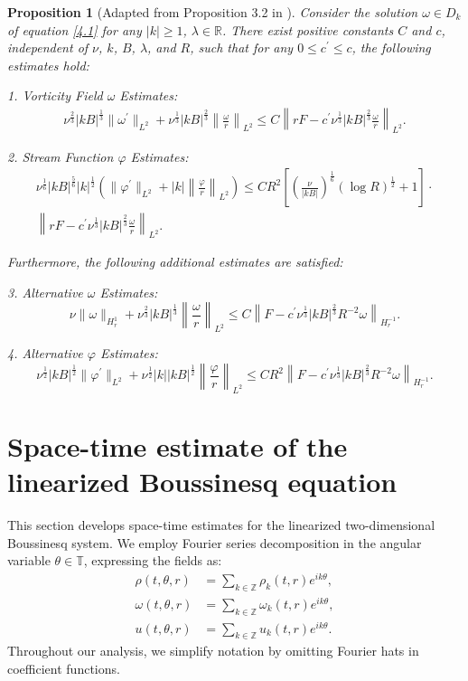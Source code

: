 \documentclass[final, 12pt,reqno]{amsart}
\newtheorem{proposition}[theorem]{\bf Proposition}
\numberwithin{equation}{section}
\begin{document}
\begin{proposition}[Adapted from Proposition 3.2 in \cite{An.2024}]\label{pro4.1}
Consider the solution $\omega \in D_k$ of equation \eqref{4.1} for any $|k| \geq 1$, $\lambda \in \mathbb{R}$. There exist positive constants $C$ and $c$, independent of $\nu$, $k$, $B$, $\lambda$, and $R$, such that for any $0 \leq c^{\prime} \leq c$, the following estimates hold:

1.  Vorticity Field $\omega$ Estimates:
    $$
    \begin{aligned}
    \nu^{\frac{2}{3}} |k B|^{\frac{1}{3}} \| \omega^{\prime} \|_{L^2} + \nu^{\frac{1}{3}} |k B|^{\frac{2}{3}} \left\| \frac{\omega}{r} \right\|_{L^2} \leq C \left\| r F - c^{\prime} \nu^{\frac{1}{3}} |k B|^{\frac{2}{3}} \frac{\omega}{r} \right\|_{L^2}.
    \end{aligned}
    $$

2.  Stream Function $\varphi$ Estimates:
    $$
    \begin{aligned}
    \nu^{\frac{1}{6}} |k B|^{\frac{5}{6}} |k|^{\frac{1}{2}} \left( \| \varphi^{\prime} \|_{L^2} + |k| \left\| \frac{\varphi}{r} \right\|_{L^2} \right) \leq C R^2 \left[ \left( \frac{\nu}{|k B|} \right)^{\frac{1}{6}} (\log R)^{\frac{1}{2}} + 1 \right] \cdot \\ \left\| r F - c^{\prime} \nu^{\frac{1}{3}} |k B|^{\frac{2}{3}} \frac{\omega}{r} \right\|_{L^2}.
    \end{aligned}
    $$

Furthermore, the following additional estimates are satisfied:

3. Alternative $\omega$ Estimates:
    $$
    \nu \| \omega \|_{H_r^1} + \nu^{\frac{2}{3}} |k B|^{\frac{1}{3}} \left\| \frac{\omega}{r} \right\|_{L^2} \leq C \left\| F - c^{\prime} \nu^{\frac{1}{3}} |k B|^{\frac{2}{3}} R^{-2} \omega \right\|_{H_r^{-1}}.
    $$

4. Alternative $\varphi$ Estimates:
    $$
    \nu^{\frac{1}{2}} |k B|^{\frac{1}{2}} \| \varphi^{\prime} \|_{L^2} + \nu^{\frac{1}{2}} |k| |k B|^{\frac{1}{2}} \left\| \frac{\varphi}{r} \right\|_{L^2} \leq C R^2 \left\| F - c^{\prime} \nu^{\frac{1}{3}} |k B|^{\frac{2}{3}} R^{-2} \omega \right\|_{H_r^{-1}}.
    $$
\end{proposition}
\section{Space-time estimate of the linearized Boussinesq equation}

This section develops space-time estimates for the linearized two-dimensional Boussinesq system. 
We employ Fourier series decomposition in the angular variable $\theta \in \mathbb{T}$, expressing the fields as:
\begin{equation}
\begin{aligned}
\rho(t,\theta,r) &= \sum_{k \in \mathbb{Z}} \rho_k(t,r) e^{ik\theta}, \\
\omega(t,\theta,r) &= \sum_{k \in \mathbb{Z}} \omega_k(t,r) e^{ik\theta}, \\
u(t,\theta,r) &= \sum_{k \in \mathbb{Z}} u_k(t,r) e^{ik\theta}.
\end{aligned}
\end{equation}
Throughout our analysis, we simplify notation by omitting Fourier hats in coefficient functions.
\end{document}
